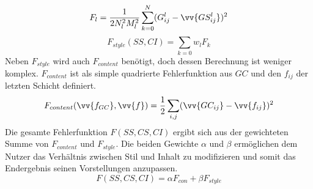 \documentclass[times, 11pt,twocolumn]{article}
\begin{document}
\footnotesize
\begin{equation}
F_l= \frac{1}{2N_l^2M_l^2}\sum_{k=0}^N (G_{ij}^l- \vv{GS_{ij}^l})^2
\label{eq:DeepStyleCorrErr}
\end{equation}
\small
\footnotesize
\begin{equation}
F_{style}(SS,CI)= \sum_{k=0} w_l F_k
\label{eq:DeepStyleStyleErr}
\end{equation}
\small
Neben $F_{style}$ wird auch $F_{content}$ benötigt, doch dessen Berechnung ist weniger komplex. $F_{content}$ ist als simple quadrierte Fehlerfunktion aus $GC$ und den $f_{ij}$ der letzten Schicht definiert. 
\footnotesize
\begin{equation}
F_{content}(\vv{f_{GC}}, \vv{f})= \frac{1}{2}\sum_{i,j}(\vv{GC_{ij}}- \vv{f_{ij}})^2
\label{eq:DeepStyleContError}
\end{equation}
\small
Die gesamte Fehlerfunktion $F(SS,CS,CI)$ ergibt sich aus der gewichteten Summe von $F_{content}$ und $F_{style}$. Die beiden Gewichte $\alpha$ und $\beta$ ermöglichen dem Nutzer das Verhältnis zwischen Stil und Inhalt zu modifizieren und somit das Endergebnis seinen Vorstellungen anzupassen. 
\footnotesize
\begin{equation}
F (SS,CS,CI)= \alpha F_{con}+\beta F_{style}
\label{eq:DeepStyleErr}
\end{equation}
\small
\end{document}
